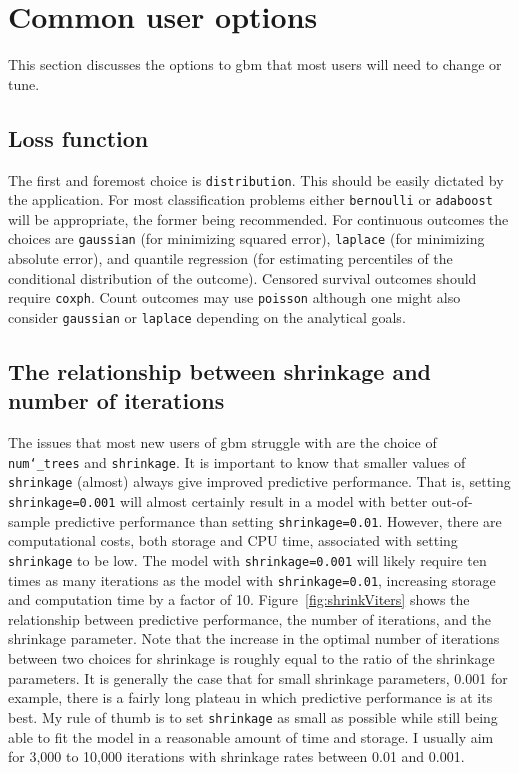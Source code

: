 \documentclass{article}
\begin{document}
\section{Common user options}

This section discusses the options to gbm that most users will need to
change or tune.

\subsection{Loss function}

The first and foremost choice is \texttt{distribution}. This should be
easily dictated by the application. For most classification problems
either \texttt{bernoulli} or \texttt{adaboost} will be appropriate,
the former being recommended. For continuous outcomes the choices are
\texttt{gaussian} (for minimizing squared error), \texttt{laplace}
(for minimizing absolute error), and quantile regression (for
estimating percentiles of the conditional distribution of the
outcome). Censored survival outcomes should require
\texttt{coxph}. Count outcomes may use \texttt{poisson} although one
might also consider \texttt{gaussian} or \texttt{laplace} depending on
the analytical goals.

\subsection{The relationship between shrinkage and number of iterations}

The issues that most new users of gbm struggle with are the choice of
\texttt{num\char`_trees} and \texttt{shrinkage}. It is important to know that
smaller values of \texttt{shrinkage} (almost) always give improved
predictive performance. That is, setting \texttt{shrinkage=0.001} will
almost certainly result in a model with better out-of-sample
predictive performance than setting \texttt{shrinkage=0.01}. However,
there are computational costs, both storage and CPU time, associated
with setting \texttt{shrinkage} to be low. The model with
\texttt{shrinkage=0.001} will likely require ten times as many
iterations as the model with \texttt{shrinkage=0.01}, increasing
storage and computation time by a factor of
10. Figure~\ref{fig:shrinkViters} shows the relationship between
predictive performance, the number of iterations, and the shrinkage
parameter. Note that the increase in the optimal number of iterations
between two choices for shrinkage is roughly equal to the ratio of the
shrinkage parameters. It is generally the case that for small
shrinkage parameters, 0.001 for example, there is a fairly long
plateau in which predictive performance is at its best. My rule of
thumb is to set \texttt{shrinkage} as small as possible while still
being able to fit the model in a reasonable amount of time and
storage. I usually aim for 3,000 to 10,000 iterations with shrinkage
rates between 0.01 and 0.001.
\end{document}
